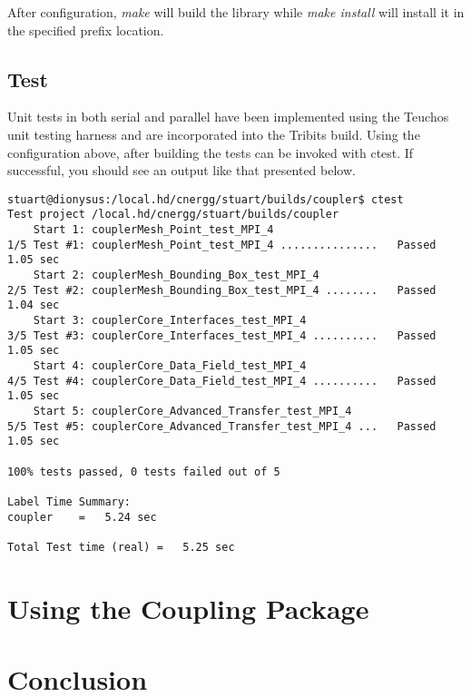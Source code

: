 \documentclass[letterpaper]{article}
\begin{document}
After configuration, {\sl make} will build the library while {\sl make
  install} will install it in the specified prefix location.

\subsection{Test}
Unit tests in both serial and parallel have been implemented using the
Teuchos unit testing harness and are incorporated into the Tribits
build. Using the configuration above, after building the tests can be
invoked with ctest. If successful, you should see an output like that
presented below.

\begin{verbatim}
stuart@dionysus:/local.hd/cnergg/stuart/builds/coupler$ ctest
Test project /local.hd/cnergg/stuart/builds/coupler
    Start 1: couplerMesh_Point_test_MPI_4
1/5 Test #1: couplerMesh_Point_test_MPI_4 ...............   Passed    1.05 sec
    Start 2: couplerMesh_Bounding_Box_test_MPI_4
2/5 Test #2: couplerMesh_Bounding_Box_test_MPI_4 ........   Passed    1.04 sec
    Start 3: couplerCore_Interfaces_test_MPI_4
3/5 Test #3: couplerCore_Interfaces_test_MPI_4 ..........   Passed    1.05 sec
    Start 4: couplerCore_Data_Field_test_MPI_4
4/5 Test #4: couplerCore_Data_Field_test_MPI_4 ..........   Passed    1.05 sec
    Start 5: couplerCore_Advanced_Transfer_test_MPI_4
5/5 Test #5: couplerCore_Advanced_Transfer_test_MPI_4 ...   Passed    1.05 sec

100% tests passed, 0 tests failed out of 5

Label Time Summary:
coupler    =   5.24 sec

Total Test time (real) =   5.25 sec
\end{verbatim}

\section{Using the Coupling Package}

\section{Conclusion}

\pagebreak


\end{document}
